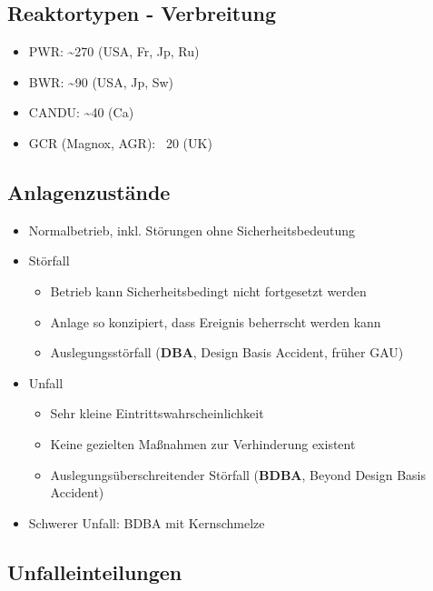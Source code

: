 \documentclass[12pt]{article}
\begin{document}
\subsection{Reaktortypen - Verbreitung}
\begin{itemize}[noitemsep]
	\item PWR: \textasciitilde 270 (USA, Fr, Jp, Ru)
	\item BWR: \textasciitilde 90 (USA, Jp, Sw)
	\item CANDU: \textasciitilde 40 (Ca)
	\item GCR (Magnox, AGR): ~20 (UK)
\end{itemize}

\subsection{Anlagenzustände}
\begin{itemize}[noitemsep]
	\item Normalbetrieb, inkl. Störungen ohne Sicherheitsbedeutung
	\item Störfall
		\begin{itemize}[noitemsep]
			\item Betrieb kann Sicherheitsbedingt nicht fortgesetzt werden
			\item Anlage so konzipiert, dass Ereignis beherrscht werden kann
			\item Auslegungsstörfall (\textbf{DBA}, Design Basis Accident, früher GAU)
		\end{itemize}
	\item Unfall
		\begin{itemize}[noitemsep]
			\item Sehr kleine Eintrittswahrscheinlichkeit
			\item Keine gezielten Maßnahmen zur Verhinderung existent
			\item Auslegungsüberschreitender Störfall (\textbf{BDBA}, Beyond Design Basis Accident)
		\end{itemize}
	\item Schwerer Unfall: BDBA mit Kernschmelze
\end{itemize}

\subsection{Unfalleinteilungen}
\end{document}

